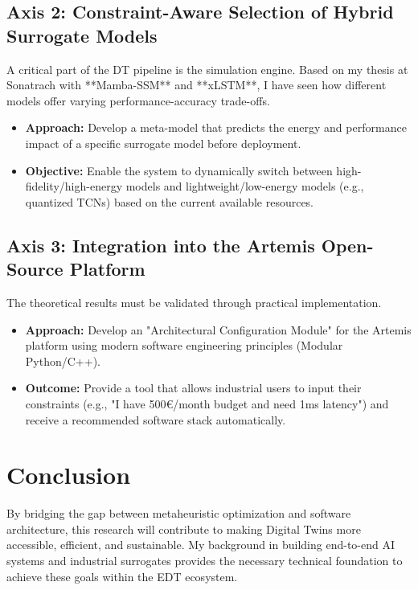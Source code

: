 \documentclass[a4paper,12pt]{article}
\begin{document}
\subsection{Axis 2: Constraint-Aware Selection of Hybrid Surrogate Models}
A critical part of the DT pipeline is the simulation engine. Based on my thesis at Sonatrach with **Mamba-SSM** and **xLSTM**, I have seen how different models offer varying performance-accuracy trade-offs.
\begin{itemize}
    \item \textbf{Approach:} Develop a meta-model that predicts the energy and performance impact of a specific surrogate model before deployment.
    \item \textbf{Objective:} Enable the system to dynamically switch between high-fidelity/high-energy models and lightweight/low-energy models (e.g., quantized TCNs) based on the current available resources.
\end{itemize}

\subsection{Axis 3: Integration into the Artemis Open-Source Platform}
The theoretical results must be validated through practical implementation.
\begin{itemize}
    \item \textbf{Approach:} Develop an "Architectural Configuration Module" for the Artemis platform using modern software engineering principles (Modular Python/C++).
    \item \textbf{Outcome:} Provide a tool that allows industrial users to input their constraints (e.g., "I have 500€/month budget and need 1ms latency") and receive a recommended software stack automatically.
\end{itemize}

\section{Conclusion}
By bridging the gap between metaheuristic optimization and software architecture, this research will contribute to making Digital Twins more accessible, efficient, and sustainable. My background in building end-to-end AI systems and industrial surrogates provides the necessary technical foundation to achieve these goals within the EDT ecosystem.
\end{document}
